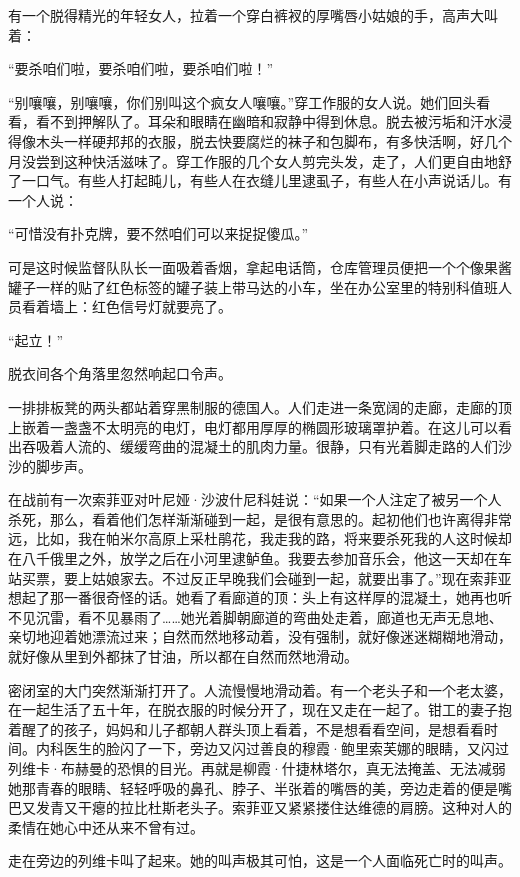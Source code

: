有一个脱得精光的年轻女人，拉着一个穿白裤衩的厚嘴唇小姑娘的手，高声大叫着：

“要杀咱们啦，要杀咱们啦，要杀咱们啦！”

“别嚷嚷，别嚷嚷，你们别叫这个疯女人嚷嚷。”穿工作服的女人说。她们回头看看，看不到押解队了。耳朵和眼睛在幽暗和寂静中得到休息。脱去被污垢和汗水浸得像木头一样硬邦邦的衣服，脱去快要腐烂的袜子和包脚布，有多快活啊，好几个月没尝到这种快活滋味了。穿工作服的几个女人剪完头发，走了，人们更自由地舒了一口气。有些人打起盹儿，有些人在衣缝儿里逮虱子，有些人在小声说话儿。有一个人说：

“可惜没有扑克牌，要不然咱们可以来捉捉傻瓜。”

可是这时候监督队队长一面吸着香烟，拿起电话筒，仓库管理员便把一个个像果酱罐子一样的贴了红色标签的罐子装上带马达的小车，坐在办公室里的特别科值班人员看着墙上：红色信号灯就要亮了。

“起立！”

脱衣间各个角落里忽然响起口令声。

一排排板凳的两头都站着穿黑制服的德国人。人们走进一条宽阔的走廊，走廊的顶上嵌着一盏盏不太明亮的电灯，电灯都用厚厚的椭圆形玻璃罩护着。在这儿可以看出吞吸着人流的、缓缓弯曲的混凝土的肌肉力量。很静，只有光着脚走路的人们沙沙的脚步声。

在战前有一次索菲亚对叶尼娅·沙波什尼科娃说：“如果一个人注定了被另一个人杀死，那么，看着他们怎样渐渐碰到一起，是很有意思的。起初他们也许离得非常远，比如，我在帕米尔高原上采杜鹃花，我走我的路，将来要杀死我的人这时候却在八千俄里之外，放学之后在小河里逮鲈鱼。我要去参加音乐会，他这一天却在车站买票，要上姑娘家去。不过反正早晚我们会碰到一起，就要出事了。”现在索菲亚想起了那一番很奇怪的话。她看了看廊道的顶：头上有这样厚的混凝土，她再也听不见沉雷，看不见暴雨了……她光着脚朝廊道的弯曲处走着，廊道也无声无息地、亲切地迎着她漂流过来；自然而然地移动着，没有强制，就好像迷迷糊糊地滑动，就好像从里到外都抹了甘油，所以都在自然而然地滑动。

密闭室的大门突然渐渐打开了。人流慢慢地滑动着。有一个老头子和一个老太婆，在一起生活了五十年，在脱衣服的时候分开了，现在又走在一起了。钳工的妻子抱着醒了的孩子，妈妈和儿子都朝人群头顶上看着，不是想看看空间，是想看看时间。内科医生的脸闪了一下，旁边又闪过善良的穆霞·鲍里索芙娜的眼睛，又闪过列维卡·布赫曼的恐惧的目光。再就是柳霞·什捷林塔尔，真无法掩盖、无法减弱她那青春的眼睛、轻轻呼吸的鼻孔、脖子、半张着的嘴唇的美，旁边走着的便是嘴巴又发青又干瘪的拉比杜斯老头子。索菲亚又紧紧搂住达维德的肩膀。这种对人的柔情在她心中还从来不曾有过。

走在旁边的列维卡叫了起来。她的叫声极其可怕，这是一个人面临死亡时的叫声。

